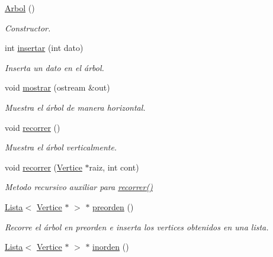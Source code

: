 \begin{DoxyCompactItemize}
\item 
\mbox{\label{classArbol_a4f5d3e25a0e1a40cb09cefa39378b7be}} 
\hyperlink{classArbol_a4f5d3e25a0e1a40cb09cefa39378b7be}{Arbol} ()
\begin{DoxyCompactList}\small\item\em Constructor. \end{DoxyCompactList}\item 
int \hyperlink{classArbol_af332559b5f9d894ecc6a707bb1550ae2}{insertar} (int dato)
\begin{DoxyCompactList}\small\item\em Inserta un dato en el árbol. \end{DoxyCompactList}\item 
void \hyperlink{classArbol_a61749974f55056420f4e5a76eb664809}{mostrar} (ostream \&out)
\begin{DoxyCompactList}\small\item\em Muestra el árbol de manera horizontal. \end{DoxyCompactList}\item 
\mbox{\label{classArbol_a5bd356760f63521e8578a83613aa4792}} 
void \hyperlink{classArbol_a5bd356760f63521e8578a83613aa4792}{recorrer} ()
\begin{DoxyCompactList}\small\item\em Muestra el árbol verticalmente. \end{DoxyCompactList}\item 
void \hyperlink{classArbol_a0ae46c572d300cd4a5f27b7d00a1a14e}{recorrer} (\hyperlink{classVertice}{Vertice} $\ast$raiz, int cont)
\begin{DoxyCompactList}\small\item\em Metodo recursivo auxiliar para \hyperlink{classArbol_a5bd356760f63521e8578a83613aa4792}{recorrer()} \end{DoxyCompactList}\item 
\hyperlink{classLista}{Lista}$<$ \hyperlink{classVertice}{Vertice} $\ast$ $>$ $\ast$ \hyperlink{classArbol_a0ffdc60ce8f2267366681cc94cf6beea}{preorden} ()
\begin{DoxyCompactList}\small\item\em Recorre el árbol en preorden e inserta los vertices obtenidos en una lista. \end{DoxyCompactList}\item 
\hyperlink{classLista}{Lista}$<$ \hyperlink{classVertice}{Vertice} $\ast$ $>$ $\ast$ \hyperlink{classArbol_a80a0c3cf2d7f3e92a5c8e5504947dab5}{inorden} ()

\end{DoxyCompactItemize}
